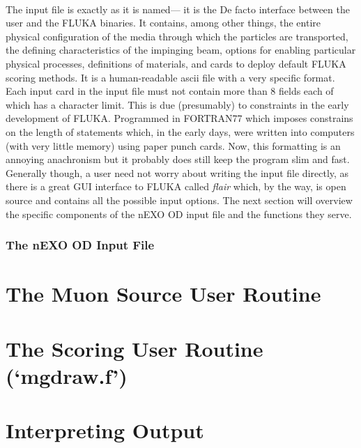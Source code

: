 \documentclass[10pt]{article}
\begin{document}
    \paragraph{}
    The input file is exactly as it is named— it is the De facto interface between the user and the FLUKA binaries. It contains, among other things, the entire physical configuration of the media through which the particles are transported, the defining characteristics of the impinging beam, options for enabling particular physical processes, definitions of materials, and cards to deploy default FLUKA scoring methods. It is a human-readable ascii file with a very specific format. Each input card in the input file must not contain more than 8 fields each of which has a character limit. This is due (presumably) to constraints in the early development of FLUKA. Programmed in FORTRAN77 which imposes constrains on the length of statements which, in the early days, were written into computers (with very little memory) using paper punch cards. Now, this formatting is an annoying anachronism but it probably does still keep the program slim and fast. Generally though, a user need not worry about writing the input file directly, as there is a great GUI interface to FLUKA called \textit{flair} which, by the way, is open source and contains all the possible input options. The next section will overview the specific components of the nEXO OD input file and the functions they serve. %


\section{The nEXO OD Input File}








\part*{The Muon Source User Routine}

\part*{The Scoring User Routine (`mgdraw.f')}

\part*{Interpreting Output}

\clearpage
\appendixheaderon
\appendixpage
\begin{appendices}



\end{appendices}






\end{document}
